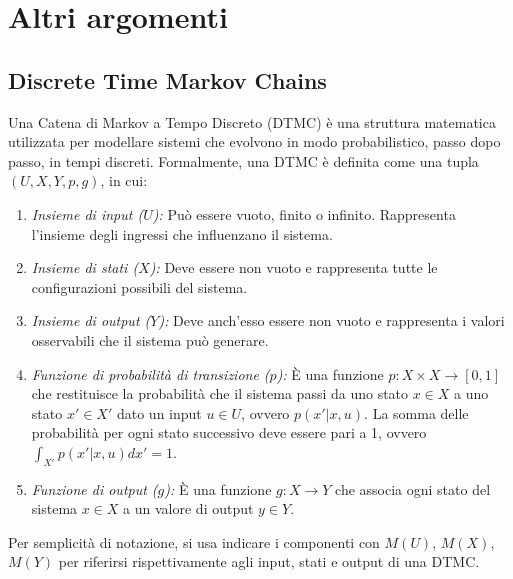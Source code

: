 \chapter{Altri argomenti}
\section{Discrete Time Markov Chains}
Una Catena di Markov a Tempo Discreto (DTMC) è una struttura matematica utilizzata per modellare sistemi che evolvono in modo probabilistico, passo dopo passo, in tempi discreti. Formalmente, una DTMC è definita come una tupla $(U,X,Y,p,g)$, in cui:
\begin{enumerate}
    \item \textit{Insieme di input ($U$):} Può essere vuoto, finito o infinito. Rappresenta l'insieme degli ingressi che influenzano il sistema. 
    \item \textit{Insieme di stati ($X$):} Deve essere non vuoto e rappresenta tutte le configurazioni possibili del sistema.
    \item \textit{Insieme di output ($Y$):} Deve anch'esso essere non vuoto e rappresenta i valori osservabili che il sistema può generare.
    \item \textit{Funzione di probabilità di transizione ($p$):} È una funzione $p:X\times X\to[0,1]$ che restituisce la probabilità che il sistema passi da uno stato $x\in X$ a uno stato $x'\in X'$ dato un input $u\in U$, ovvero $p(x'|x, u)$. La somma delle probabilità per ogni stato successivo deve essere pari a 1, ovvero $\int_{X'}p(x'|x,u)dx'=1$.
    \item \textit{Funzione di output ($g$):} È una funzione $g:X\to Y$ che associa ogni stato del sistema $x\in X$ a un valore di output $y\in Y$.
\end{enumerate}
Per semplicità di notazione, si usa indicare i componenti con $M(U)$, $M(X)$, $M(Y)$ per riferirsi rispettivamente agli input, stati e output di una DTMC.

